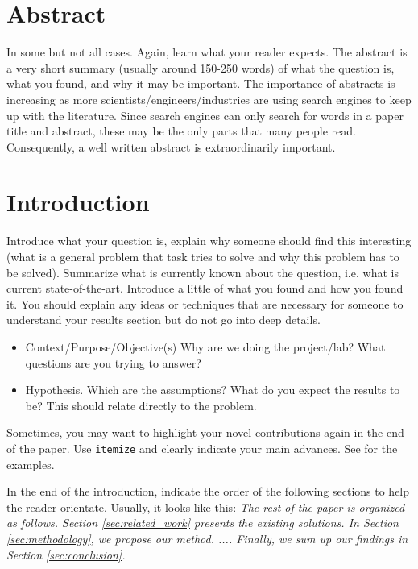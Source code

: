 \documentclass[10pt,conference,compsocconf]{IEEEtran}
\begin{document}
\section*{Abstract}
In some but not all cases. Again, learn what your reader expects. The abstract is a very short summary (usually around 150-250 words) of what the question is, what you found, and why it may be important. The importance of abstracts is increasing as more scientists/engineers/industries are using search engines to keep up with the literature. Since search engines can only search for words in a paper title and abstract, these may be the only parts that many people read. Consequently, a well written abstract is extraordinarily important.

\section{Introduction}

Introduce what your question is, explain why someone should find this interesting (what is a general problem that task tries to solve and why this problem has to be solved). Summarize what is currently known about the question, i.e. what is current state-of-the-art. Introduce a little of what you found and how you found it. You should explain any ideas or techniques that are necessary for someone to understand your results section but do not go into deep details.
\begin{itemize}
	\item Context/Purpose/Objective(s) Why are we doing the project/lab? What questions are you trying to answer?
	\item Hypothesis. Which are the assumptions? What do you expect the results to be? This should relate directly to the problem.
\end{itemize}

Sometimes, you may want to highlight your novel contributions again in the end of the paper. Use \texttt{itemize} and clearly indicate your main advances. See \cite{pegg2023rtfs, huang2022you} for the examples.

In the end of the introduction, indicate the order of the following sections to help the reader orientate. Usually, it looks like this: \textit{The rest of the paper is organized as follows. Section \ref{sec:related_work} presents the existing solutions. In Section \ref{sec:methodology}, we propose our method. .... Finally, we sum up our findings in Section \ref{sec:conclusion}.}
\end{document}
